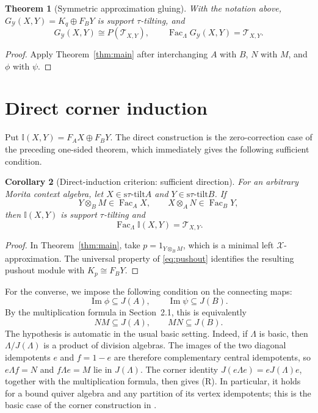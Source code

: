 \documentclass[11pt,reqno]{amsart}
\newtheorem{theorem}{Theorem}[section]
\newtheorem{corollary}[theorem]{Corollary}
\theoremstyle{definition}
\theoremstyle{remark}
\newcommand{\Fac}{\operatorname{Fac}}
\newcommand{\stau}{\mathrm{s}\tau\text{-}\mathrm{tilt}}
\numberwithin{equation}{section}
\begin{document}
\begin{theorem}[Symmetric approximation gluing]\label{thm:symmetric}
With the notation above,
$G_{\mathcal Y}(X,Y)=K_q\oplus F_BY$ is support $\tau$-tilting, and
\[
 G_{\mathcal Y}(X,Y)\cong P(\mathcal T_{X,Y}),
 \qquad
 \Fac_\Lambda G_{\mathcal Y}(X,Y)=\mathcal T_{X,Y}.
\]
\end{theorem}

\begin{proof}
Apply Theorem~\ref{thm:main} after interchanging $A$ with $B$, $N$ with
$M$, and $\phi$ with $\psi$.
\end{proof}

\section{Direct corner induction}

Put $\mathbb I(X,Y)=F_AX\oplus F_BY$.  The direct construction is the
zero-correction case of the preceding one-sided theorem, which immediately
gives the following sufficient condition.

\begin{corollary}[Direct-induction criterion: sufficient direction]
\label{cor:direct-sufficient}
For an arbitrary Morita context algebra, let $X\in\stau A$ and
$Y\in\stau B$.  If
\[
 Y\otimes_BM\in\Fac_AX,
 \qquad
 X\otimes_AN\in\Fac_BY,
\]
then $\mathbb I(X,Y)$ is support $\tau$-tilting and
\[
 \Fac_\Lambda\mathbb I(X,Y)=\mathcal T_{X,Y}.
\]
\end{corollary}

\begin{proof}
In Theorem~\ref{thm:main}, take
$p=1_{Y\otimes_BM}$, which is a minimal left $\mathcal X$-approximation.
The universal property of \eqref{eq:pushout} identifies the resulting
pushout module with $K_p\cong F_BY$.
\end{proof}

For the converse, we impose the following condition on the connecting maps:
\begin{equation*}\tag{R}
 \operatorname{Im}\phi\subseteq J(A),
 \qquad
 \operatorname{Im}\psi\subseteq J(B).
\end{equation*}
By the multiplication formula in Section~2.1, this is equivalently
\[
 NM\subseteq J(A),\qquad MN\subseteq J(B).
\]
The hypothesis is automatic in the usual basic setting.  Indeed, if
$\Lambda$ is basic, then $\Lambda/J(\Lambda)$ is a product of division
algebras.  The images of the two diagonal idempotents $e$ and $f=1-e$ are
therefore complementary central idempotents, so
$e\Lambda f=N$ and $f\Lambda e=M$ lie in $J(\Lambda)$.  The corner identity
$J(e\Lambda e)=eJ(\Lambda)e$, together with the multiplication formula,
then gives \textup{(R)}.  In particular, it holds for a bound quiver algebra
and any partition of its vertex idempotents; this is the basic case of the
corner construction in \cite[Example~2.10]{GreenPsaroudakis}.
\end{document}
